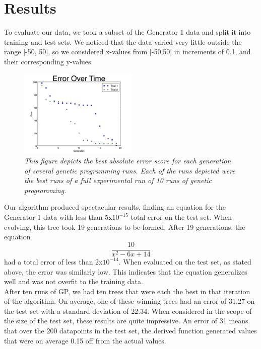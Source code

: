 
\section{Results}
\label{sec:results}

     To evaluate our data, we took a subset of the Generator 1 data
and split it into training and test sets. We noticed that the
data varied very little outside the range [-50, 50], so we
considered x-values from [-50,50] in increments of 0.1, and
their corresponding y-values.\\

\begin{figure}[htb]

  \centering  %

  \includegraphics[width=0.5\textwidth]{figs/Generator1.jpg}

  \caption{\emph{This figure depicts the best absolute error score for each
    generation of several genetic programming runs. Each of the runs
    depicted were the best runs of a full experimental run of 10 runs of
    genetic programming.}}


  \label{fig:tex}

\end{figure}

Our algorithm produced spectacular results, finding an equation for
the Generator 1 data with less than 5x$10^{-15}$ total error on the test
set. When evolving, this tree took 19 generations to be formed. After
19 generations, the equation  $$\frac{10}{x^2-6x+14}$$  had a total error of
less than 2x$10^{-14}$. When evaluated on the test set, as stated above, the
error was similarly low. This indicates that the equation generalizes
well and was not overfit to the training data.\\

After ten runs of GP, we had ten trees that were each the best in that iteration of the algorithm. On average, one of these winning trees had an error of 31.27 on the test set with a standard deviation of 22.34. When considered in the scope of the size of the test set, these results are quite impressive. An error of 31 means that over the 200 datapoints in the test set, the derived function generated values that were on average 0.15 off from the actual values.\\

